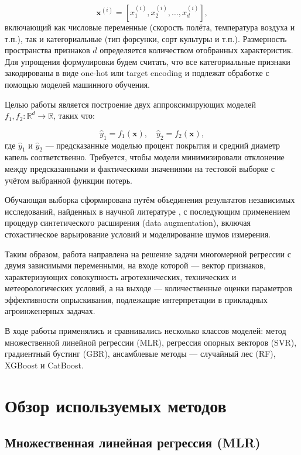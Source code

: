 \begin{equation}
\mathbf{x}^{(i)} = \left[ x_1^{(i)}, x_2^{(i)}, \ldots, x_d^{(i)} \right],
\end{equation}
включающий как числовые переменные (скорость полёта, температура воздуха и т.п.), так и категориальные (тип форсунки, сорт культуры и т.п.). Размерность пространства признаков $d$ определяется количеством отобранных характеристик. Для упрощения формулировки будем считать, что все категориальные признаки закодированы в виде one-hot или target encoding и подлежат обработке с помощью моделей машинного обучения.

Целью работы является построение двух аппроксимирующих моделей $f_1, f_2: \mathbb{R}^d \to \mathbb{R}$, таких что:

\begin{equation}
	\hat{y}_1 = f_1(\mathbf{x}), \quad \hat{y}_2 = f_2(\mathbf{x}),
\end{equation}
где $\hat{y}_1$ и $\hat{y}_2$ --- предсказанные моделью процент покрытия и средний диаметр капель соответственно. Требуется, чтобы модели минимизировали отклонение между предсказанными и фактическими значениями на тестовой выборке с учётом выбранной функции потерь. 

Обучающая выборка сформирована путём объединения результатов независимых  исследований, найденных в научной литературе \cite{Liu2025, Wu2025}, с последующим применением процедур синтетического расширения (data augmentation), включая стохастическое варьирование условий и моделирование шумов измерения.

Таким образом, работа направлена на решение задачи многомерной регрессии с двумя зависимыми переменными, на входе которой --- вектор признаков, характеризующих совокупность агротехнических, технических и метеорологических условий, а на выходе --- количественные оценки параметров эффективности опрыскивания, подлежащие интерпретации в прикладных агроинженерных задачах.

В ходе работы применялись и сравнивались несколько классов моделей: метод множественной линейной регрессии (MLR), регрессия опорных векторов (SVR), градиентный бустинг (GBR), ансамблевые методы --- случайный лес (RF), XGBoost и CatBoost.

\section{Обзор используемых методов} \label{ch1:methods}
\subsection{Множественная линейная регрессия (MLR)}
